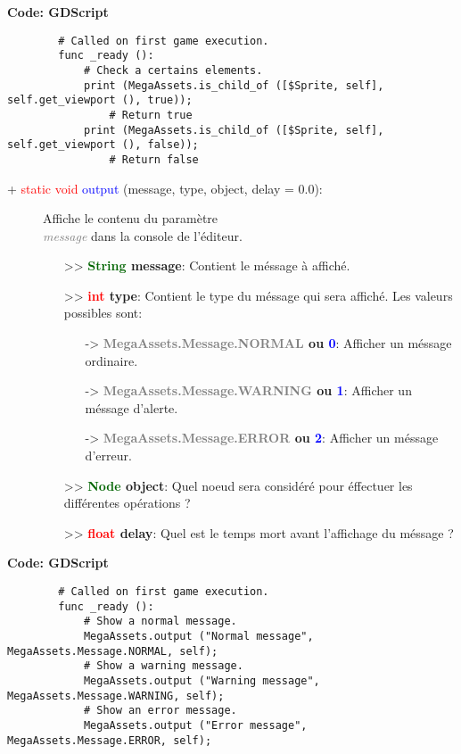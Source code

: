 \documentclass[a4paper, 11pt]{article}
\begin{document}
	\textbf{Code: GDScript}
	\begin{lstlisting}
		# Called on first game execution.
		func _ready ():
			# Check a certains elements.
			print (MegaAssets.is_child_of ([$Sprite, self], self.get_viewport (), true));
				# Return true
			print (MegaAssets.is_child_of ([$Sprite, self], self.get_viewport (), false));
				# Return false
	\end{lstlisting}
	\newpage \begin{description}
		\item [+ \textcolor{red}{static void} \textcolor{blue}{\hypertarget{output}{output}} (message, type, 
		object, delay = 0.0):] Affiche le contenu du paramètre \textit{\textcolor{gray}{\\message}} dans la 
		console de l'éditeur.
		\begin{itemize}
			\item [>> \textbf{\textcolor{darkgreen}{String} message}:] Contient le méssage à affiché.
			\item [>> \textbf{\textcolor{red}{int} type}:] Contient le type du méssage qui sera affiché. Les 
			valeurs possibles sont:
			\begin{itemize}
				\item [-> \textbf{\textcolor{gray}{MegaAssets.Message.NORMAL} ou \textcolor{blue}{0}}:] 
				Afficher un méssage ordinaire.
				\item [-> \textbf{\textcolor{gray}{MegaAssets.Message.WARNING} ou \textcolor{blue}{1}}:] 
				Afficher un méssage d'alerte.
				\item [-> \textbf{\textcolor{gray}{MegaAssets.Message.ERROR} ou \textcolor{blue}{2}}:] 
				Afficher un méssage d'erreur.
			\end{itemize}
			\item [>> \textbf{\textcolor{darkgreen}{Node} object}:] Quel noeud sera considéré pour éffectuer
			les différentes opérations ?
			\item [>> \textbf{\textcolor{red}{float} delay}:] Quel est le temps mort avant l'affichage du 
			méssage ?\\
		\end{itemize}
	\end{description}
	\textbf{Code: GDScript}
	\begin{lstlisting}
		# Called on first game execution.
		func _ready ():
			# Show a normal message.
			MegaAssets.output ("Normal message", MegaAssets.Message.NORMAL, self);
			# Show a warning message.
			MegaAssets.output ("Warning message", MegaAssets.Message.WARNING, self);
			# Show an error message.
			MegaAssets.output ("Error message", MegaAssets.Message.ERROR, self);
	\end{lstlisting}
\end{document}
